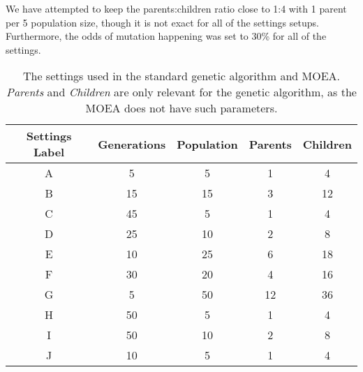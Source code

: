 We have attempted to keep the parents:children ratio close to 1:4 with 1 parent per 5 population size, though it is not exact for all of the settings setups. Furthermore, the odds of mutation happening was set to 30\% for all of the settings.

\begin{table}[!h]
	\begin{center}
	\renewcommand{\arraystretch}{1}
	\caption{The settings used in the standard genetic algorithm and MOEA. \textit{Parents} and \textit{Children} are only relevant for the genetic algorithm, as the MOEA does not have such parameters.}
	\label{tab:results_evolution_combinations}
		\begin{tabular}{| c | c | c | c | c |}
		\hline
		Settings Label & Generations & Population & Parents & Children \\
		\hline
		A 	& 5 	& 5 	& 1 	& 4 \\
		\hline
		B 	& 15 	& 15 	& 3 	& 12 \\
		\hline
		C 	& 45 	& 5 	& 1 	& 4 \\
		\hline
		D 	& 25 	& 10 	& 2 	& 8 \\
		\hline
		E 	& 10 	& 25 	& 6 	& 18 \\
		\hline
		F 	& 30 	& 20 	& 4 	& 16 \\
		\hline
		G 	& 5 	& 50 	& 12 	& 36 \\
		\hline
		H 	& 50 	& 5 	& 1 	& 4 \\
		\hline
		I 	& 50 	& 10 	& 2 	& 8 \\
		\hline
		J 	& 10 	& 5 	& 1 	& 4 \\
		\hline
		\end{tabular}
	\end{center}
\end{table}

